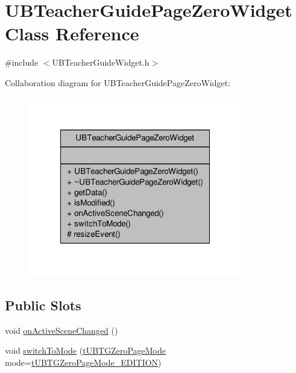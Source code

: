 \hypertarget{class_u_b_teacher_guide_page_zero_widget}{\section{U\-B\-Teacher\-Guide\-Page\-Zero\-Widget Class Reference}
\label{db/df0/class_u_b_teacher_guide_page_zero_widget}
}


{\ttfamily \#include $<$U\-B\-Teacher\-Guide\-Widget.\-h$>$}



Collaboration diagram for U\-B\-Teacher\-Guide\-Page\-Zero\-Widget\-:
\nopagebreak
\begin{figure}[H]
\begin{center}
\leavevmode
\includegraphics[width=264pt]{dc/d4c/class_u_b_teacher_guide_page_zero_widget__coll__graph}
\end{center}
\end{figure}
\subsection*{Public Slots}
\begin{DoxyCompactItemize}
\item 
void \hyperlink{class_u_b_teacher_guide_page_zero_widget_ae94780318048694960dbec593507cfba}{on\-Active\-Scene\-Changed} ()
\item 
void \hyperlink{class_u_b_teacher_guide_page_zero_widget_aa5a0c1e02206622df3022893d9f54f8c}{switch\-To\-Mode} (\hyperlink{_u_b_teacher_guide_widget_8h_ac5e4571b6875d1abcfeefd125cc59669}{t\-U\-B\-T\-G\-Zero\-Page\-Mode} mode=\hyperlink{_u_b_teacher_guide_widget_8h_ac5e4571b6875d1abcfeefd125cc59669a5699a01d947d1bf5e3517ee22eb1f9b3}{t\-U\-B\-T\-G\-Zero\-Page\-Mode\-\_\-\-E\-D\-I\-T\-I\-O\-N})
\end{DoxyCompactItemize}
